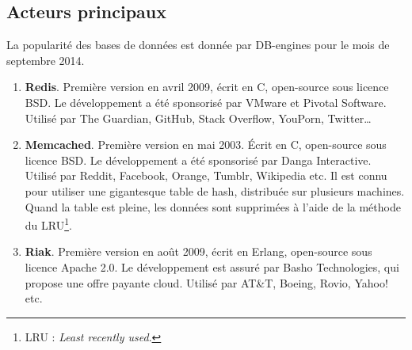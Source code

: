 \subsection{Acteurs principaux}
	La popularité des bases de données est donnée par DB-engines\cite{db_engines_key_value} pour le mois de septembre 2014.

	\begin{enumerate}
		\item \textbf{Redis}. Première version en avril 2009, écrit en C, open-source sous licence BSD. Le développement a été sponsorisé par VMware et Pivotal Software. Utilisé par The Guardian, GitHub, Stack Overflow, YouPorn, Twitter\dots\cite{Wikipedia_redis}
		\item \textbf{Memcached}. Première version en mai 2003. Écrit en C, open-source sous licence BSD. Le développement a été sponsorisé par Danga Interactive. Utilisé par Reddit, Facebook, Orange, Tumblr, Wikipedia etc. Il est connu pour utiliser une gigantesque table de hash, distribuée sur plusieurs machines. Quand la table est pleine, les données sont supprimées à l'aide de la méthode du LRU\footnote{LRU : \textit{Least recently used}.}.\cite{Wikipedia_memcached}
		\item \textbf{Riak}. Première version en août 2009, écrit en Erlang, open-source sous licence Apache 2.0. Le développement est assuré par Basho Technologies, qui propose une offre payante cloud. Utilisé par AT\&T, Boeing, Rovio, Yahoo! etc.\cite{Wikipedia_riak}
	\end{enumerate}
